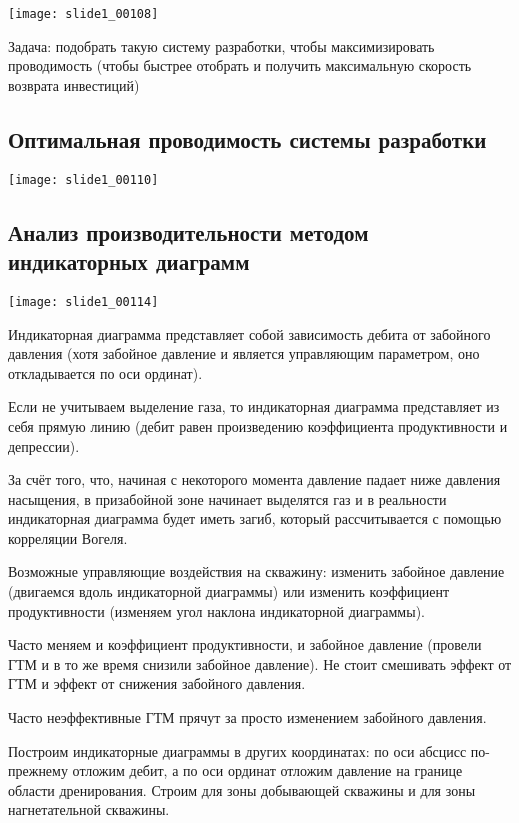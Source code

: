 \documentclass[main.tex]{subfiles}
\begin{document}
\texttt{[image: slide1\_00108]}

Задача: подобрать такую систему разработки, чтобы максимизировать проводимость (чтобы быстрее отобрать и получить максимальную скорость возврата инвестиций)


\subsection{Оптимальная проводимость системы разработки}

\texttt{[image: slide1\_00110]}



\subsection{Анализ производительности методом индикаторных диаграмм}

\texttt{[image: slide1\_00114]}

Индикаторная диаграмма представляет собой зависимость дебита от забойного давления (хотя забойное давление и является управляющим параметром, оно откладывается по оси ординат).

Если не учитываем выделение газа, то индикаторная диаграмма представляет из себя прямую линию (дебит равен произведению коэффициента продуктивности и депрессии).

За счёт того, что, начиная с некоторого момента давление падает ниже давления насыщения, в призабойной зоне начинает выделятся газ и в реальности индикаторная диаграмма будет иметь загиб, который рассчитывается с помощью корреляции Вогеля.

Возможные управляющие воздействия на скважину: изменить забойное давление (двигаемся вдоль индикаторной диаграммы) или изменить коэффициент продуктивности (изменяем угол наклона индикаторной диаграммы).

Часто меняем и коэффициент продуктивности, и забойное давление (провели ГТМ и в то же время снизили забойное давление). Не стоит смешивать эффект от ГТМ и эффект от снижения забойного давления.

Часто неэффективные ГТМ прячут за просто изменением забойного давления.


Построим индикаторные диаграммы в других координатах: по оси абсцисс по-прежнему отложим дебит, а по оси ординат отложим давление на границе области дренирования. Строим для зоны добывающей скважины и для зоны нагнетательной скважины.
\end{document}
